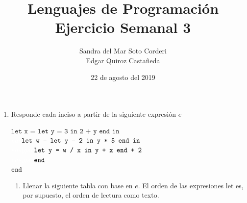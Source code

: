 \documentclass{article}
\begin{document}
    \title{
        Lenguajes de Programación \\
        Ejercicio Semanal 3
    }

    \author{
        Sandra del Mar Soto Corderi \\
        Edgar Quiroz Castañeda
    }

    \date{
        22 de agosto del 2019
    }
    
    \maketitle

    \begin{enumerate}
        \item {
            Responde cada inciso a partir de la siguiente expresión $e$
                            
            	$\texttt{let x = let y = 3 in 2 + y end in}$\\
            	$\textcolor{white}{eas}\texttt{let w = let y = 2 in y * 5 end in}$\\
            	$\textcolor{white}{easypie}\texttt{let y = w / x in y + x end + 2}$\\
            	$\textcolor{white}{easypie}\texttt{end}$\\
            	$\texttt{end}$\\
            
            
            \begin{enumerate}
            	\item { Llenar la siguiente tabla con base en $e$. El orden de las expresiones let es, por supuesto, el orden de lectura
            		como texto.
            	
}
\end{enumerate}}
\end{enumerate}
\end{document}
